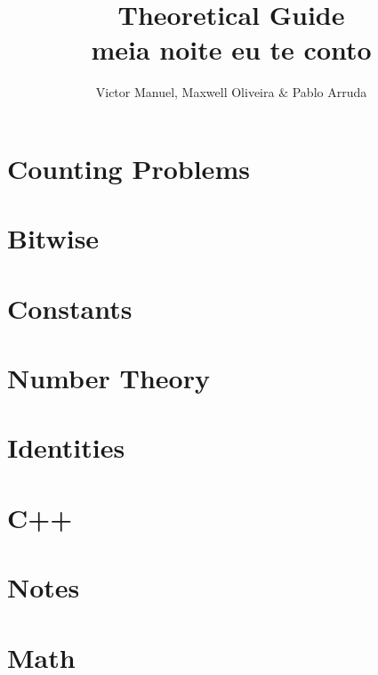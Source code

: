 \documentclass[10pt, twocolumn]{article}
\title{\vspace{-2cm}\textbf{Theoretical Guide\\meia noite eu te conto}}
\author{Victor Manuel, Maxwell Oliveira $\&$ Pablo Arruda}
\affil{\textit{Thanks to UFMG - Humuhumunukunukuapua'a}}
\date{}
\begin{document}
\maketitle\section{Counting Problems}

\section{Bitwise}


\section{Constants}



\section{Number Theory}








\section{Identities}

\section{C++}






\section{Notes}

\section{Math}






\end{document}
